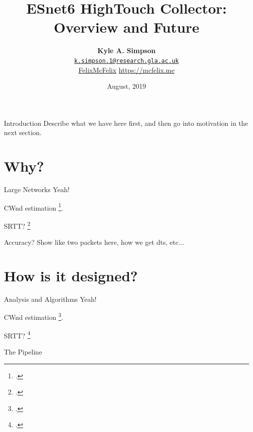 \documentclass[aspectratio=169,xcolor={dvipsnames}
,hide notes
]{beamer}
\title{ESnet6 HighTouch Collector: Overview and Future}
\author{\vspace{-1em}\textbf{Kyle A. Simpson}\\
	\faEnvelopeO{} \href{mailto:k.simpson.1@research.gla.ac.uk}{\nolinkurl{k.simpson.1@research.gla.ac.uk}}\\
	\vspace{1em}\small{\faGithub{} \href{https://github.com/felixmcfelix}{FelixMcFelix} \hspace{0.5em} \faGlobe{} \url{https://mcfelix.me}}}
\institute{University of Glasgow}
\date{\nth{29} August, 2019}
\begin{document}
\begin{frame}
\maketitle
{}
\end{frame}

\begin{frame}{Introduction}
	Describe what we have here first, and then go into motivation in the next section.
\end{frame}

\section{Why?}

\begin{frame}{Large Networks}
	Yeah!
	
	CWnd estimation \footcite{DBLP:conf/sosr/GhasemiBR17}.
	
	SRTT? \footcite{DBLP:journals/ccr/KarnP87}
\end{frame}

\begin{frame}{Accuracy?}
	Show like two packets here, how we get dts, etc...
\end{frame}

\section{How is it designed?}

\begin{frame}{Analysis and Algorithms}
	Yeah!
	
	CWnd estimation \footcite{DBLP:conf/sosr/GhasemiBR17}.
	
	SRTT? \footcite{DBLP:journals/ccr/KarnP87}
\end{frame}

\begin{frame}{The Pipeline}
	
\end{frame}
\end{document}

